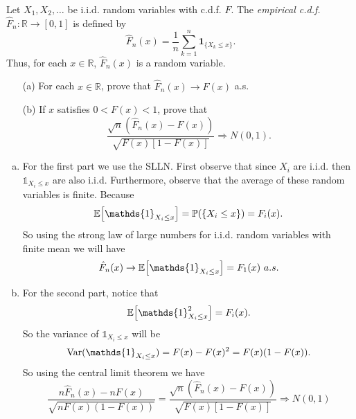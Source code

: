 \begin{problem}
	Let \( X_1, X_2, \dots \) be i.i.d. random variables with c.d.f. \( F \). The \textit{empirical c.d.f.} \( \hat{F}_n : \mathbb{R} \to [0,1] \) is defined by
	\[
	\hat{F}_n(x) = \frac{1}{n} \sum_{k=1}^n \mathbf{1}_{\{X_k \leq x\}}.
	\]
	Thus, for each \( x \in \mathbb{R} \), \( \hat{F}_n(x) \) is a random variable.
	\begin{itemize}
		\item[(a)] For each \( x \in \mathbb{R} \), prove that \( \hat{F}_n(x) \to F(x) \) a.s.
		\item[(b)] If \( x \) satisfies \( 0 < F(x) < 1 \), prove that
		\[
		\frac{\sqrt{n} \left( \hat{F}_n(x) - F(x) \right)}{\sqrt{F(x)[1 - F(x)]}} \Rightarrow N(0,1).
		\]
	\end{itemize}
\end{problem}
\begin{solution}
	\begin{enumerate}[(a)]
		\item For the first part we use the SLLN. First observe that since $ X_i $ are i.i.d. then $ \mathds{1}_{X_i\leq x} $ are also i.i.d. Furthermore, observe that the average of these random variables is finite. Because
		\[ \E{\mathds{1}_{X_i\leq x}} = \prob(\set{X_i\leq x}) = F_i(x). \]
		So using the strong law of large numbers for i.i.d. random variables with finite mean we will have
		\[ \hat{F}_n(x) \to \E{\mathds{1}_{X_i\leq x}} = F_1(x) \ a.s. \]
		\item For the second part, notice that 
		\[ \E{\mathds{1}_{X_i\leq x}^2} = F_i(x). \]
		So the variance of $ \mathds{1}_{X_i\leq x} $ will be
		\[ \Var(\mathds{1}_{X_i\leq x}) = F(x) - F(x)^2 = F(x)(1 - F(x)). \]
		So using the central limit theorem we have
		\[ \frac{n\hat{F}_n(x) - nF(x)}{\sqrt{n F(x)(1 - F(x)) }} =  \frac{\sqrt{n} \left( \hat{F}_n(x) - F(x) \right)}{\sqrt{F(x)[1 - F(x)]}} \Rightarrow N(0,1) \]
	\end{enumerate}
\end{solution}

